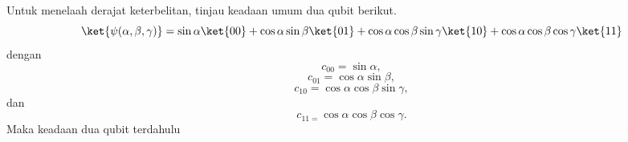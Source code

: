 Untuk menelaah derajat keterbelitan, tinjau keadaan umum dua qubit berikut.
\begin{equation}
	\ket{\psi(\alpha,\beta,\gamma)}=\sin\alpha\ket{00}+\cos\alpha\sin\beta\ket{01}+\cos\alpha\cos\beta\sin\gamma\ket{10}+\cos\alpha\cos\beta\cos\gamma\ket{11}
\end{equation}
dengan
\begin{equation*}
	c_{00}=\sin\alpha,
\end{equation*}
\begin{equation*}
	c_{01}=\cos\alpha\sin\beta,
\end{equation*}
\begin{equation*}
	c_{10}=\cos\alpha\cos\beta\sin\gamma,
\end{equation*}
dan
\begin{equation*}
	c_{11=}\cos\alpha\cos\beta\cos\gamma.
\end{equation*}
Maka keadaan dua qubit terdahulu
